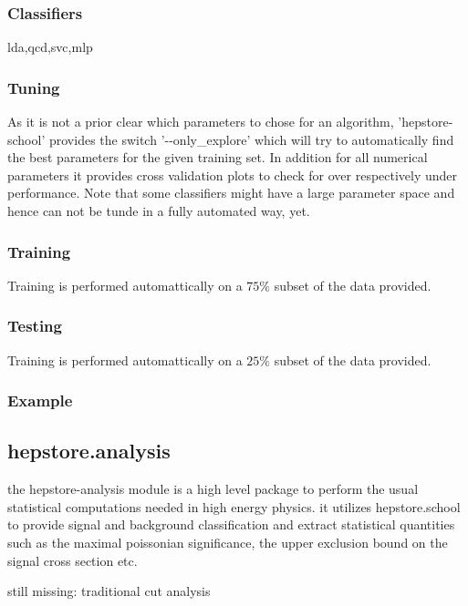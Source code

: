 \documentclass[aps,prd,11pt,tightenlines,superscriptaddress,nofootinbib,preprintnumbers,notitlepage]{revtex4-1}
\begin{document}
\subsubsection{Classifiers}

lda,qcd,svc,mlp

\subsubsection{Tuning}

As it is not a prior clear which parameters to chose for an algorithm, 'hepstore-school' provides the switch '-{}-only\_explore' which will try to automatically find the best parameters for the given training set. In addition for all numerical parameters it provides cross validation plots to check for over respectively under performance. Note that some classifiers might have a large parameter space and hence can not be tunde in a fully automated way, yet.

\subsubsection{Training}

Training is performed automattically on a $75\%$ subset of the data provided.

\subsubsection{Testing}

Training is performed automattically on a $25\%$ subset of the data provided.

\subsubsection{Example}

\subsection{hepstore.analysis}

the hepstore-analysis module is a high level package to perform the usual statistical computations needed in high energy physics. it utilizes hepstore.school to provide signal and background classification and extract statistical quantities such as the maximal poissonian significance, the upper exclusion bound on the signal cross section etc.

still missing: traditional cut analysis
\end{document}
